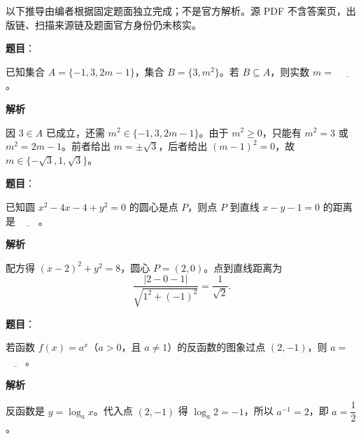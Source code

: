 

\begin{gktip}
以下推导由编者根据固定题面独立完成；不是官方解析。源 PDF 不含答案页，出版链、扫描来源链及题面官方身份仍未核实。
\end{gktip}


\begin{answer}

\textbf{题目}：

已知集合 $A=\{-1,3,2m-1\}$，集合 $B=\{3,m^2\}$。若 $B\subseteq A$，则实数 $m=$ $\underline{\qquad}$。

\textbf{解析}

因 $3\in A$ 已成立，还需 $m^2\in\{-1,3,2m-1\}$。由于 $m^2\ge0$，只能有 $m^2=3$ 或 $m^2=2m-1$。前者给出 $m=\pm\sqrt3$，后者给出 $(m-1)^2=0$，故 $m\in\{-\sqrt3,1,\sqrt3\}$。


\end{answer}
\begin{answer}

\textbf{题目}：

已知圆 $x^2-4x-4+y^2=0$ 的圆心是点 $P$，则点 $P$ 到直线 $x-y-1=0$ 的距离是 $\underline{\qquad}$。

\textbf{解析}

配方得 $(x-2)^2+y^2=8$，圆心 $P=(2,0)$。点到直线距离为
\nopagebreak[4]
\[
\frac{|2-0-1|}{\sqrt{1^2+(-1)^2}}=\frac1{\sqrt2}.
\]


\end{answer}
\begin{answer}

\textbf{题目}：

若函数 $f(x)=a^x$（$a>0$，且 $a\ne1$）的反函数的图象过点 $(2,-1)$，则 $a=$ $\underline{\qquad}$。

\textbf{解析}

反函数是 $y=\log_a x$。代入点 $(2,-1)$ 得 $\log_a2=-1$，所以 $a^{-1}=2$，即 $a=\dfrac12$。


\end{answer}
